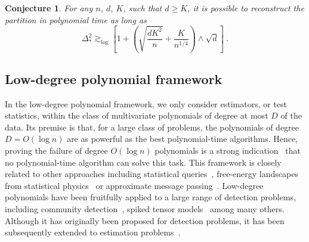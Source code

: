 \documentclass{article}
\newtheorem{conjecture}{Conjecture}
\begin{document}
\begin{conjecture}\label{conject:optimal_clustering_condition}
For any $n$, $d$, $K$, such that $d\geq K$, it is possible to reconstruct the partition in polynomial time as long as
\begin{equation}\label{eq:LD_general:upper_bound}
\Delta_*^2 \gtrsim_{\log}  \left[1 + \left( \sqrt{\frac{dK^2}{n}}+  \frac{K}{n^{1/4}} \right)  \wedge \sqrt{d} \right]\ .
\end{equation}
\end{conjecture}




\subsection{Low-degree polynomial framework}\label{sec:LD}




 In the low-degree polynomial framework, we only consider estimators, or test statistics, within the class of multivariate polynomials of degree at most $D$ of the data. Its premise is that, for a large class of problems, the polynomials of degree $D=O(\log n)$ are as powerful as the best polynomial-time algorithms. Hence, proving the failure of degree $O(\log n)$ polynomials is a strong indication~\cite{KuniskyWeinBandeira,SurveyWein2025} that no polynomial-time algorithm can solve this task. This framework is closely related to other approaches  including statistical queries~\cite{brennan2020statistical}, free-energy landscapes from statistical physics~\cite{bandeira2022franz} or approximate message passing~\cite{montanari2024equivalence}.  Low-degree polynomials have been fruitfully applied to a large range of detection problems, including  community detection~\cite{Hopkins17}, spiked tensor models~\cite{Hopkins17,KuniskyWeinBandeira} among many others. Although it has originally been proposed for detection problems, it has been subsequently extended to estimation problems~\cite{SchrammWein22,SohnWein25,CGGV25}. 


\medskip 
\end{document}
